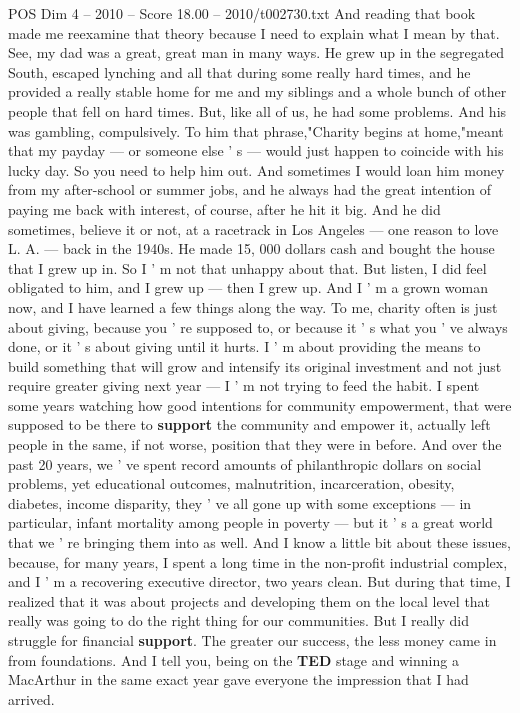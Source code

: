 \begin{textsample}{POS Dim 4 – 2010 – Score 18.00 – 2010/t002730.txt}
And reading that book made me reexamine that theory because I need to explain what I mean by that.
See, my dad was a great, great man in many ways.
He grew up in the segregated South, escaped lynching and all that during some really hard times, and he provided a really stable home for me and my siblings and a whole bunch of other people that fell on hard times.
But, like all of us, he had some problems.
And his was gambling, compulsively.
To him that phrase,"Charity begins at home,"meant that my payday — or someone else ' s — would just happen to coincide with his lucky day.
So you need to help him out.
And sometimes I would loan him money from my after-school or summer jobs, and he always had the great intention of paying me back with interest, of course, after he hit it big.
And he did sometimes, believe it or not, at a racetrack in Los Angeles — one reason to love L.
A. — back in the 1940s.
He made 15, 000 dollars cash and bought the house that I grew up in.
So I ' m not that unhappy about that.
But listen, I did feel obligated to him, and I grew up — then I grew up.
And I ' m a grown woman now, and I have learned a few things along the way.
To me, charity often is just about giving, because you ' re supposed to, or because it ' s what you ' ve always done, or it ' s about giving until it hurts.
I ' m about providing the means to build something that will grow and intensify its original investment and not just require greater giving next year — I ' m not trying to feed the habit.
I spent some years watching how good intentions for community empowerment, that were supposed to be there to \textbf{support} the community and empower it, actually left people in the same, if not worse, position that they were in before.
And over the past 20 years, we ' ve spent record amounts of philanthropic dollars on social problems, yet educational outcomes, malnutrition, incarceration, obesity, diabetes, income disparity, they ' ve all gone up with some exceptions — in particular, infant mortality among people in poverty — but it ' s a great world that we ' re bringing them into as well.
And I know a little bit about these issues, because, for many years, I spent a long time in the non-profit industrial complex, and I ' m a recovering executive director, two years clean.
But during that time, I realized that it was about projects and developing them on the local level that really was going to do the right thing for our communities.
But I really did struggle for financial \textbf{support}.
The greater our success, the less money came in from foundations.
And I tell you, being on the \textbf{TED} stage and winning a MacArthur in the same exact year gave everyone the impression that I had arrived.

\end{textsample}
